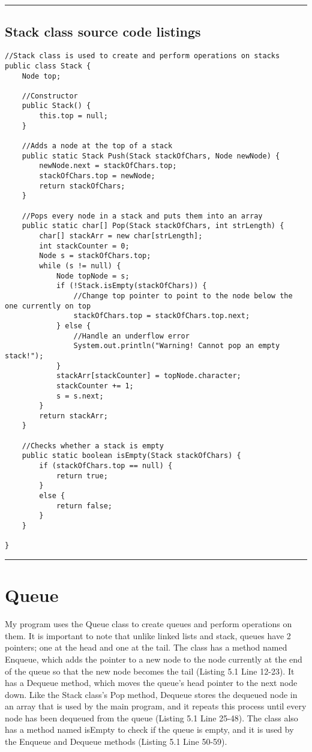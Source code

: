 \documentclass[letterpaper, 10pt,DIV=13]{scrartcl}
\numberwithin{equation}{section} %
\numberwithin{figure}{section} %
\numberwithin{table}{section} %
\newcommand{\horrule}[1]{\rule{\linewidth}{#1}} %
\begin{document}
\horrule{0pt}  	%

\subsection{Stack class source code listings}
\lstset{numbers=left, numberstyle=\tiny, stepnumber=1, numbersep=5pt, basicstyle=\footnotesize\ttfamily}
\begin{lstlisting}[frame=single, ] 
//Stack class is used to create and perform operations on stacks
public class Stack {
    Node top;

    //Constructor
    public Stack() {
        this.top = null;
    }
    
    //Adds a node at the top of a stack
    public static Stack Push(Stack stackOfChars, Node newNode) {
        newNode.next = stackOfChars.top;
        stackOfChars.top = newNode;
        return stackOfChars;
    }
    
    //Pops every node in a stack and puts them into an array
    public static char[] Pop(Stack stackOfChars, int strLength) {
        char[] stackArr = new char[strLength];
        int stackCounter = 0;
        Node s = stackOfChars.top;
        while (s != null) {
            Node topNode = s;
            if (!Stack.isEmpty(stackOfChars)) {
                //Change top pointer to point to the node below the one currently on top 
                stackOfChars.top = stackOfChars.top.next;
            } else {
                //Handle an underflow error
                System.out.println("Warning! Cannot pop an empty stack!");
            }
            stackArr[stackCounter] = topNode.character;
            stackCounter += 1;
            s = s.next;
        }
        return stackArr;
    }

    //Checks whether a stack is empty
    public static boolean isEmpty(Stack stackOfChars) {
        if (stackOfChars.top == null) {
            return true;
        }
        else {
            return false;
        }
    }

}
\end{lstlisting}

\horrule{0pt}  	%

\section{Queue}\label{operations}
My program uses the Queue class to create queues and perform operations on them. It is important to note that unlike linked lists and stack, queues have 2 pointers; one at the head and one at the tail. The class has a method named Enqueue, which adds the pointer to a new node to the node currently at the end of the queue so that the new node becomes the tail (Listing 5.1 Line 12-23). It has a Dequeue method, which moves the queue's head pointer to the next node down. Like the Stack class's Pop method, Dequeue stores the dequeued node in an array that is used by the main program, and it repeats this process until every node has been dequeued from the queue (Listing 5.1 Line 25-48). The class also has a method named isEmpty to check if the queue is empty, and it is used by the Enqueue and Dequeue methods (Listing 5.1 Line 50-59).
\end{document}
